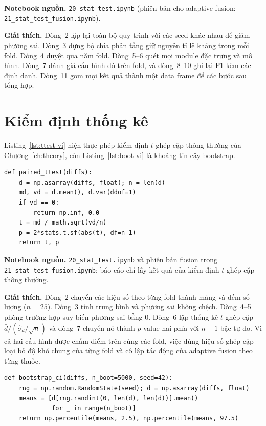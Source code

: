 \documentclass[../main.tex]{subfiles}
\begin{document}
\noindent\textbf{Notebook nguồn.} \texttt{20\_stat\_test.ipynb} (phiên bản cho adaptive fusion: \texttt{21\_stat\_test\_fusion.ipynb}).

\noindent\textbf{Giải thích.} Dòng~2 lặp lại toàn bộ quy trình với các seed khác nhau để giảm phương sai. Dòng~3 dựng bộ chia phân tầng giữ nguyên tỉ lệ kháng trong mỗi fold. Dòng~4 duyệt qua năm fold. Dòng~5--6 quét mọi module đặc trưng và mô hình. Dòng~7 đánh giá cấu hình đó trên fold, và dòng~8--10 ghi lại F1 kèm các định danh. Dòng~11 gom mọi kết quả thành một data frame để các bước sau tổng hợp.

\section{Kiểm định thống kê}

Listing~\ref{lst:ttest-vi} hiện thực phép kiểm định $t$ ghép cặp thông thường của Chương~\ref{ch:theory}, còn Listing~\ref{lst:boot-vi} là khoảng tin cậy bootstrap.

\begin{lstlisting}[caption={Kiểm định $t$ ghép cặp trên hiệu số F1 theo từng fold.},label=lst:ttest-vi]
def paired_ttest(diffs):
    d = np.asarray(diffs, float); n = len(d)
    md, vd = d.mean(), d.var(ddof=1)
    if vd == 0:
        return np.inf, 0.0
    t = md / math.sqrt(vd/n)
    p = 2*stats.t.sf(abs(t), df=n-1)
    return t, p
\end{lstlisting}

\noindent\textbf{Notebook nguồn.} \texttt{20\_stat\_test.ipynb} và phiên bản fusion trong \texttt{21\_stat\_test\_fusion.ipynb}; báo cáo chỉ lấy kết quả của kiểm định $t$ ghép cặp thông thường.

\noindent\textbf{Giải thích.} Dòng~2 chuyển các hiệu số theo từng fold thành mảng và đếm số lượng ($n=25$). Dòng~3 tính trung bình và phương sai không chệch. Dòng~4--5 phòng trường hợp suy biến phương sai bằng $0$. Dòng~6 lập thống kê $t$ ghép cặp $\bar{d}/(\hat{\sigma}_d/\sqrt{n})$ và dòng~7 chuyển nó thành $p$-value hai phía với $n-1$ bậc tự do. Vì cả hai cấu hình được chấm điểm trên cùng các fold, việc dùng hiệu số ghép cặp loại bỏ độ khó chung của từng fold và cô lập tác động của adaptive fusion theo từng thuốc.

\begin{lstlisting}[caption={Khoảng tin cậy bootstrap cho hiệu trung bình.},label=lst:boot-vi]
def bootstrap_ci(diffs, n_boot=5000, seed=42):
    rng = np.random.RandomState(seed); d = np.asarray(diffs, float)
    means = [d[rng.randint(0, len(d), len(d))].mean()
             for _ in range(n_boot)]
    return np.percentile(means, 2.5), np.percentile(means, 97.5)
\end{lstlisting}
\end{document}
